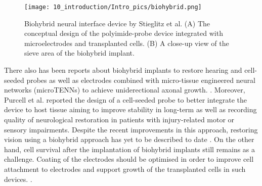 \begin{figure}[H]
\centering
\texttt{[image: 10\_introduction/Intro\_pics/biohybrid.png]} 
\caption{Biohybrid neural interface device by Stieglitz et al. (A) The conceptual design of the polyimide-probe device integrated with microelectrodes and transplanted cells. (B) A close-up view of the sieve area of the biohybrid implant. }
\label{fig:Biohybrid Implants}
\end{figure}

There also has been reports about biohybrid implants to restore hearing and cell-seeded probes as well as electrodes combined with micro-tissue engineered neural networks (microTENNs) to achieve uniderectional axonal growth. \cite{rochford2020bio}. Moreover, Purcell et al. reported the design of a cell-seeded probe to better integrate the device to host tissue aiming to improve stability in long-term as well as recording quality of neurological restoration in patients with injury-related motor or sensory impairments.\cite{purcell2009vivo} Despite the recent improvements in this approach, restoring vision using a biohybrid approach has yet to be described to date \cite{rochford2020bio}. On the other hand, cell survival after the implantation of biohybrid implants still remains as a challenge. Coating of the electrodes should be optimised in order to improve cell attachment to electrodes and support growth of the transplanted cells in such devices. \cite{rochford2020bio}.








